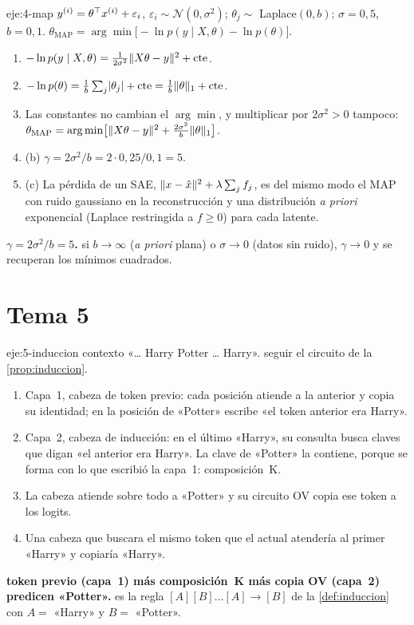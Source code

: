 \begin{solucion}{eje:4-map}
\datos $y^{(i)}=\theta^{\top} x^{(i)}+\varepsilon_i$, $\varepsilon_i\sim\mathcal{N}(0,\sigma^{2})$; $\theta_j\sim$ Laplace$(0,b)$; $\sigma=0{,}5$, $b=0{,}1$.
\planteamiento $\theta_{\mathrm{MAP}}=\arg\min\bigl[-\ln p(y\mid X,\theta)-\ln p(\theta)\bigr]$.
\pasos
\begin{enumerate}[label=\arabic*.]
  \item $-\ln p(y\mid X,\theta)=\frac{1}{2\sigma^{2}}\lVert X\theta-y\rVert^{2}+\text{cte}$.
  \item $-\ln p(\theta)=\frac1b\sum_j\lvert\theta_j\rvert+\text{cte}=\frac1b\lVert\theta\rVert_1+\text{cte}$.
  \item Las constantes no cambian el $\arg\min$, y multiplicar por $2\sigma^{2}>0$ tampoco: $\theta_{\mathrm{MAP}}=\arg\min\bigl[\lVert X\theta-y\rVert^{2}+\frac{2\sigma^{2}}{b}\lVert\theta\rVert_1\bigr]$.
  \item (b) $\gamma=2\sigma^{2}/b=2\cdot 0{,}25/0{,}1=5$.
  \item (c) La pérdida de un SAE, $\lVert x-\hat x\rVert^{2}+\lambda\sum_jf_j$, es del mismo modo el MAP con ruido gaussiano en la reconstrucción y una distribución \emph{a priori} exponencial (Laplace restringida a $f\ge 0$) para cada latente.
\end{enumerate}
\resultado \textbf{$\gamma=2\sigma^{2}/b=5$.}
\comprobacion si $b\to\infty$ (\emph{a priori} plana) o $\sigma\to 0$ (datos sin ruido), $\gamma\to 0$ y se recuperan los mínimos cuadrados.
\end{solucion}

\section{Tema 5}

\begin{solucion}{eje:5-induccion}
\datos contexto «\ldots{} Harry Potter \ldots{} Harry».
\planteamiento seguir el circuito de la \cref{prop:induccion}.
\pasos
\begin{enumerate}[label=\arabic*.]
  \item Capa~1, cabeza de token previo: cada posición atiende a la anterior y copia su identidad; en la posición de «Potter» escribe «el token anterior era Harry».
  \item Capa~2, cabeza de inducción: en el último «Harry», su consulta busca claves que digan «el anterior era Harry». La clave de «Potter» la contiene, porque se forma con lo que escribió la capa~1: composición~K.
  \item La cabeza atiende sobre todo a «Potter» y su circuito OV copia ese token a los logits.
  \item Una cabeza que buscara el mismo token que el actual atendería al primer «Harry» y copiaría «Harry».
\end{enumerate}
\resultado \textbf{token previo (capa~1) más composición~K más copia OV (capa~2) predicen «Potter».}
\comprobacion es la regla $[A][B]\ldots[A]\to[B]$ de la \cref{def:induccion} con $A=$ «Harry» y $B=$ «Potter».
\end{solucion}


